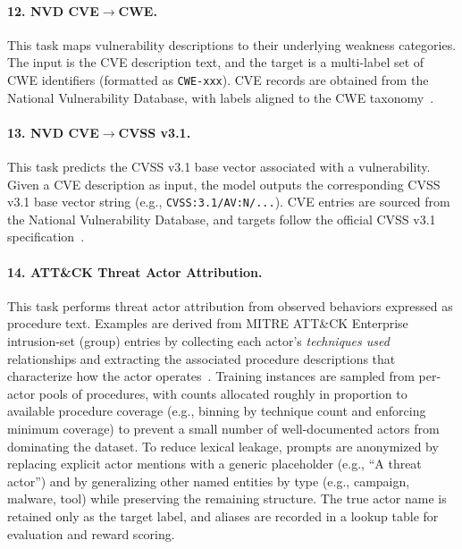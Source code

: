 







\paragraph{12. NVD CVE$\rightarrow$CWE.}
This task maps vulnerability descriptions to their underlying weakness categories. The input is the CVE description text, and the target is a multi-label set of CWE identifiers (formatted as \texttt{CWE-xxx}). CVE records are obtained from the National Vulnerability Database, with labels aligned to the CWE taxonomy~\citep{nvd,cwe}.

\paragraph{13. NVD CVE$\rightarrow$CVSS v3.1.}
This task predicts the CVSS v3.1 base vector associated with a vulnerability. Given a CVE description as input, the model outputs the corresponding CVSS v3.1 base vector string (e.g., \texttt{CVSS:3.1/AV:N/...}). CVE entries are sourced from the National Vulnerability Database, and targets follow the official CVSS v3.1 specification~\citep{nvd,cvss_v31}.








\paragraph{14. ATT\&CK Threat Actor Attribution.}
This task performs threat actor attribution from observed behaviors expressed as procedure text. Examples are derived from MITRE ATT\&CK Enterprise intrusion-set (group) entries by collecting each actor’s \textit{techniques used} relationships and extracting the associated procedure descriptions that characterize how the actor operates~\citep{mitre_attack,attack_stix_data}. Training instances are sampled from per-actor pools of procedures, with counts allocated roughly in proportion to available procedure coverage (e.g., binning by technique count and enforcing minimum coverage) to prevent a small number of well-documented actors from dominating the dataset. To reduce lexical leakage, prompts are anonymized by replacing explicit actor mentions with a generic placeholder (e.g., ``A threat actor'') and by generalizing other named entities by type (e.g., campaign, malware, tool) while preserving the remaining structure. The true actor name is retained only as the target label, and aliases are recorded in a lookup table for evaluation and reward scoring.





